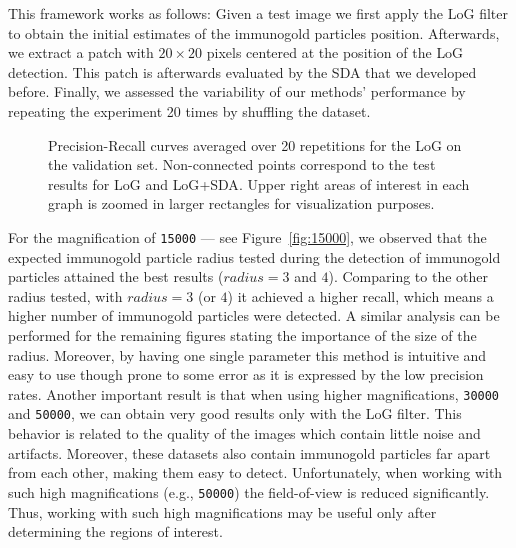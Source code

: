 \documentclass[a4paper,11pt]{article}
\newcommand{\1}{\mathbbm{1}}
\newcommand{\fref}[1]{Figure~\ref{#1}}
\newcommand{\db}[1]{\texttt{#1}}
\theoremstyle{plain}
\begin{document}
This framework works as follows: Given a test image we first apply the \ac{LoG} filter to obtain the initial estimates of the immunogold particles position. Afterwards, we extract a patch with $20 \times 20$ pixels centered at the position of the \ac{LoG} detection. This patch is afterwards evaluated by the \ac{SDA} that we developed before. Finally, we assessed the variability of our methods' performance by repeating the experiment 20 times by shuffling the dataset.

\begin{figure*}[t]
\begin{center}
\hfill
{}
\hfill
{}
\hfill
{}
\caption{Precision-Recall curves averaged over 20 repetitions for the \ac{LoG} on the validation set. Non-connected points correspond to the test results for \ac{LoG} and \ac{LoG}+\ac{SDA}. Upper right areas of interest in each graph is zoomed in larger rectangles for visualization purposes.}
\label{fig:log_sda_results}
\end{center}
\end{figure*}
For the magnification of \db{15000} --- see \fref{fig:15000}, we observed that the expected immunogold particle radius tested during the detection of immunogold particles attained the best results ($radius = 3$ and $4$). Comparing to the other radius tested, with $radius = 3$ (or $4$) it achieved a higher recall, which means a higher number of immunogold particles were detected. A similar analysis can be performed for the remaining figures stating the importance of the size of the radius.
Moreover, by having one single parameter this method is intuitive and easy to use though prone to some error as it is expressed by the low precision rates. Another important result is that when using higher magnifications, \db{30000} and \db{50000}, we can obtain very good results only with the \ac{LoG} filter. This behavior is related to the quality of the images which contain little noise and artifacts. Moreover, these datasets also contain immunogold particles far apart from each other, making them easy to detect. Unfortunately, when working with such high magnifications (e.g., \db{50000}) the field-of-view is reduced significantly. Thus, working with such high magnifications may be useful only after determining the regions of interest.
\end{document}
